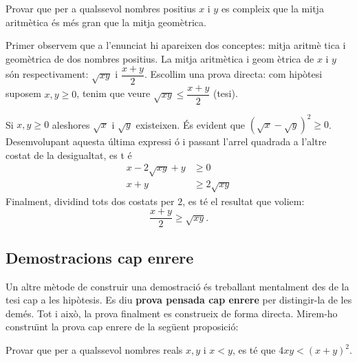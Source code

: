 \begin{exem}
Provar que per a qualssevol nombres positius $x$ i $y$ es compleix que la
mitja aritm\`{e}tica \'{e}s m\'{e}s gran que la mitja geom\`{e}trica.
\end{exem}

\begin{solucio}
Primer observem que a l'enunciat hi apareixen dos conceptes: mitja aritm\`{e}%
tica i geom\`{e}trica de dos nombres positius. La mitja aritm\`{e}tica i geom%
\`{e}trica de $x$ i $y$ s\'{o}n respectivament: $\sqrt{xy}$ i $\dfrac{x+y}{2}
$. Escollim una prova directa: com hip\`{o}tesi suposem $x,y\geq0$, tenim
que veure $\sqrt{xy}\leq\dfrac{x+y}{2}$ (tesi).

Si $x,y\geq0$ aleshores $\sqrt{x}$ i $\sqrt{y}$ existeixen. \'{E}s evident
que $(\sqrt{x}-\sqrt{y})^{2}\geq0$. Desemvolupant aquesta \'{u}ltima expressi%
\'{o} i passant l'arrel quadrada a l'altre costat de la desigualtat, es t%
\'{e}%
\begin{align*}
x-2\sqrt{xy}+y & \geq0 \\
x+y & \geq2\sqrt{xy}
\end{align*}
Finalment, dividind tots dos costats per $2$, es t\'{e} el resultat que
voliem:%
\begin{equation*}
\frac{x+y}{2}\geq\sqrt{xy}\text{.}
\end{equation*}
\end{solucio}

\subsection{Demostracions cap enrere}

Un altre m\`{e}tode de construir una demostraci\'{o} \'{e}s treballant
mentalment des de la tesi cap a les hip\`{o}tesis. Es diu \textbf{prova
pensada cap enrere} per distingir-la de les dem\'{e}s. Tot i aix\`{o}, la
prova finalment es construeix de forma directa. Mirem-ho constru\"{\i}nt la
prova cap enrere de la seg\"{u}ent proposici\'{o}:

\begin{exem}
Provar que per a qualssevol nombres reals $x,y$ i $x<y$, es t\'{e} que $%
4xy<(x+y)^{2}$.
\end{exem}

